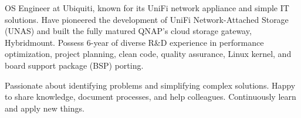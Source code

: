 

\begin{cvparagraph}

OS Engineer at Ubiquiti, known for its UniFi network appliance and simple IT
solutions. Have pioneered the development of UniFi Network-Attached Storage
(UNAS) and built the fully matured QNAP's cloud storage gateway, Hybridmount.
Possess 6-year of diverse R\&D experience in performance optimization, project
planning, clean code, quality assurance, Linux kernel, and board support package
(BSP) porting.

Passionate about identifying problems and simplifying complex solutions.
Happy to share knowledge, document processes, and help colleagues.
Continuously learn and apply new things.
%
%

\end{cvparagraph}
